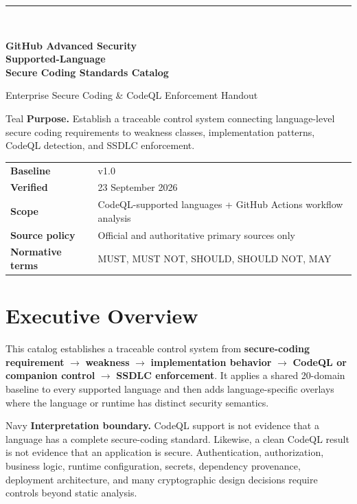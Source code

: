 \documentclass[10pt,letterpaper]{article}
\begin{document}
\hypersetup{pageanchor=false}
\begin{titlepage}
\thispagestyle{empty}
\vspace*{1.0in}
{\color{Teal}\rule{1.2in}{3pt}}\\[0.35in]
{\Huge\bfseries\color{Navy}GitHub Advanced Security\\[0.12in]Supported-Language\\[0.12in]Secure Coding Standards Catalog\par}
\vspace{0.28in}
{\Large\color{Teal}Enterprise Secure Coding \& CodeQL Enforcement Handout\par}
\vspace{0.55in}
\begin{callout}{Teal}
\textbf{Purpose.} Establish a traceable control system connecting language-level secure coding requirements to weakness classes, implementation patterns, CodeQL detection, and SSDLC enforcement.
\end{callout}
\vfill
\begin{tabular}{@{}ll@{}}
\textbf{Baseline} & v1.0 \\
\textbf{Verified} & 23 September 2026 \\
\textbf{Scope} & CodeQL-supported languages + GitHub Actions workflow analysis \\
\textbf{Source policy} & Official and authoritative primary sources only \\
\textbf{Normative terms} & MUST, MUST NOT, SHOULD, SHOULD NOT, MAY \\
\end{tabular}
\vspace{0.7in}
\end{titlepage}
\hypersetup{pageanchor=true}
\tableofcontents
\clearpage
{}

\section{Executive Overview}
This catalog establishes a traceable control system from \textbf{secure-coding requirement} $\rightarrow$ \textbf{weakness} $\rightarrow$ \textbf{implementation behavior} $\rightarrow$ \textbf{CodeQL or companion control} $\rightarrow$ \textbf{SSDLC enforcement}. It applies a shared 20-domain baseline to every supported language and then adds language-specific overlays where the language or runtime has distinct security semantics.

\begin{callout}{Navy}
\textbf{Interpretation boundary.} CodeQL support is not evidence that a language has a complete secure-coding standard. Likewise, a clean CodeQL result is not evidence that an application is secure. Authentication, authorization, business logic, runtime configuration, secrets, dependency provenance, deployment architecture, and many cryptographic design decisions require controls beyond static analysis.
\end{callout}
\end{document}
